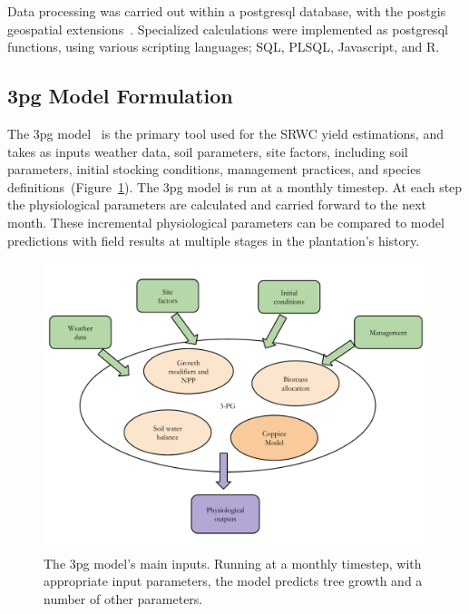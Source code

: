 \documentclass[preprint,12pt]{elsarticle}
\begin{document}
Data processing was carried out within a postgresql database, with the
postgis geospatial extensions~\cite{pgsql,Holl2009,postgis}.
Specialized calculations were implemented as postgresql functions, using
various scripting languages; SQL, PLSQL, Javascript, and R.


\subsection{\acs{3pg} Model Formulation}
\label{sec:3pg}

The \acf{3pg} model~\cite{Landsberg1997, landsberg2010physiological,
  Sands2004} is the primary tool used for the \ac{SRWC} yield
estimations, and takes as inputs weather data, soil parameters, site
factors, including soil parameters, initial stocking conditions,
management practices, and species
definitions~(Figure~\ref{fig:overview}).  The \ac{3pg} model is run at
a monthly timestep. At each step the physiological parameters are
calculated and carried forward to the next month.  These incremental
physiological parameters can be compared to model predictions with
field results at multiple stages in the plantation's history.

\begin{figure}[p]
\includegraphics[width=\linewidth]{model_overview}
\caption{ The \ac{3pg} model's main inputs.  Running at a monthly timestep, with
appropriate input parameters, the model predicts tree growth and a
number of other parameters.}
\label{fig:overview}
\end{figure}
\end{document}

